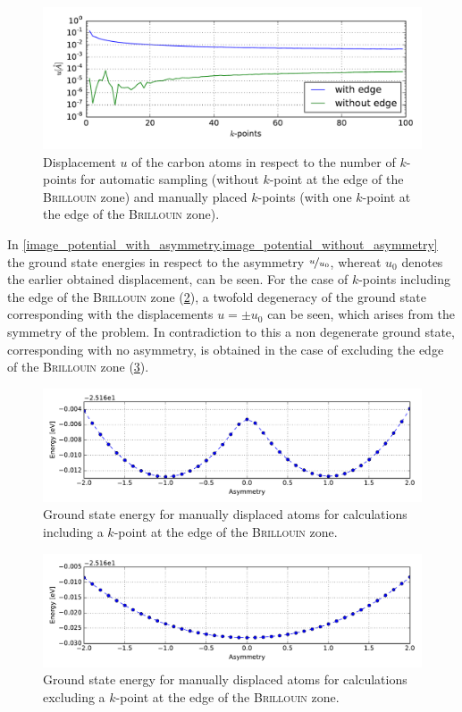 \begin{figure}
	\centering
	\includegraphics[width = 13cm]{Images/polyacetylene/convergence/polyacetylene_displacement}
	\caption{Displacement $u$ of the carbon atoms in respect to the number of $k$-points for automatic sampling (without $k$-point at the edge of the \textsc{Brillouin} zone) and manually placed $k$-points (with one $k$-point at the edge of the \textsc{Brillouin} zone).}
	\label{image_k_point_sampling_assymetry}
\end{figure}
In \cref{image_potential_with_asymmetry,image_potential_without_asymmetry} the ground state energies in respect to the asymmetry $\nicefrac{u}{u_0}$, whereat $u_0$ denotes the earlier obtained displacement, can be seen. For the case of $k$-points including the edge of the \textsc{Brillouin} zone (\cref{image_potential_with_asymmetry}), a twofold degeneracy of the ground state corresponding with the displacements $u = \pm u_0$ can be seen, which arises from the symmetry of the problem. In contradiction to this a non degenerate ground state, corresponding with no asymmetry, is obtained in the case of excluding the edge of the \textsc{Brillouin} zone (\cref{image_potential_without_asymmetry}).\\
\begin{figure}
	\centering
	\includegraphics[width = 13cm]{Images/polyacetylene/convergence/Potential_with_asymmetry}
	\caption{Ground state energy for manually displaced atoms for calculations including a $k$-point at the edge of the \textsc{Brillouin} zone.}
	\label{image_potential_with_asymmetry}
\end{figure}
\begin{figure}[!p]
	\centering
	\includegraphics[width = 13cm]{Images/polyacetylene/convergence/Potential_without_asymmetry}
	\caption{Ground state energy for manually displaced atoms for calculations excluding a $k$-point at the edge of the \textsc{Brillouin} zone.}
	\label{image_potential_without_asymmetry}
\end{figure}
